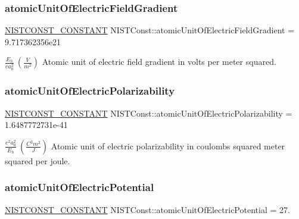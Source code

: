 \subsubsection{\texorpdfstring{atomic\+Unit\+Of\+Electric\+Field\+Gradient}{atomicUnitOfElectricFieldGradient}}
{\footnotesize\ttfamily \mbox{\hyperlink{group___n_i_s_t_const-_macros_ga2b0fc1d7452373f816175dd86ce26729}{N\+I\+S\+T\+C\+O\+N\+S\+T\+\_\+\+C\+O\+N\+S\+T\+A\+NT}} N\+I\+S\+T\+Const\+::atomic\+Unit\+Of\+Electric\+Field\+Gradient = 9.\+717362356e21}

$\frac{E_h}{e a_0^2}\ (\frac{V}{m^2})$ Atomic unit of electric field gradient in volts per meter squared. \mbox{\label{group___n_i_s_t_const-_atomic_unit_ga635fe4831055d2787293d19a8134c0c7}} 
\subsubsection{\texorpdfstring{atomic\+Unit\+Of\+Electric\+Polarizability}{atomicUnitOfElectricPolarizability}}
{\footnotesize\ttfamily \mbox{\hyperlink{group___n_i_s_t_const-_macros_ga2b0fc1d7452373f816175dd86ce26729}{N\+I\+S\+T\+C\+O\+N\+S\+T\+\_\+\+C\+O\+N\+S\+T\+A\+NT}} N\+I\+S\+T\+Const\+::atomic\+Unit\+Of\+Electric\+Polarizability = 1.\+6487772731e-\/41}

$\frac{e^2 a_0^2}{E_h} \ (\frac{C^2 m^2}{J})$ Atomic unit of electric polarizability in coulombs squared meter squared per joule. \mbox{\label{group___n_i_s_t_const-_atomic_unit_gaabb37ce172d4f7c491b79ac27db120da}} 
\subsubsection{\texorpdfstring{atomic\+Unit\+Of\+Electric\+Potential}{atomicUnitOfElectricPotential}}
{\footnotesize\ttfamily \mbox{\hyperlink{group___n_i_s_t_const-_macros_ga2b0fc1d7452373f816175dd86ce26729}{N\+I\+S\+T\+C\+O\+N\+S\+T\+\_\+\+C\+O\+N\+S\+T\+A\+NT}} N\+I\+S\+T\+Const\+::atomic\+Unit\+Of\+Electric\+Potential = 27.}

